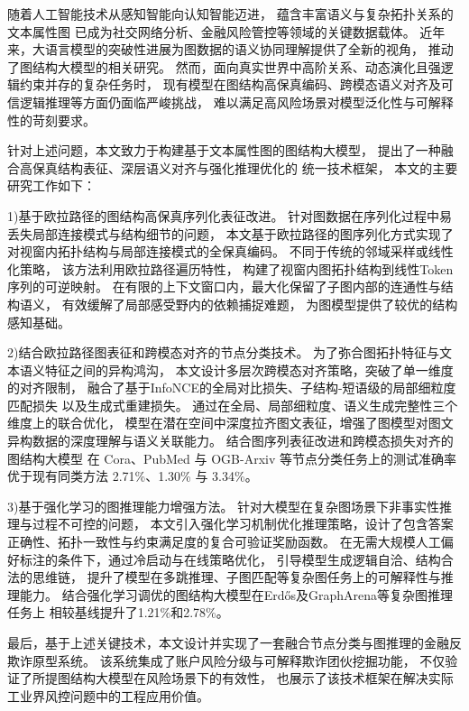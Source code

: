 \begin{cabstract}
    随着人工智能技术从感知智能向认知智能迈进，
    蕴含丰富语义与复杂拓扑关系的文本属性图
    已成为社交网络分析、金融风险管控等领域的关键数据载体。
    近年来，大语言模型的突破性进展为图数据的语义协同理解提供了全新的视角，
    推动了图结构大模型的相关研究。
    然而，面向真实世界中高阶关系、动态演化且强逻辑约束并存的复杂任务时，
    现有模型在图结构高保真编码、跨模态语义对齐及可信逻辑推理等方面仍面临严峻挑战，
    难以满足高风险场景对模型泛化性与可解释性的苛刻要求。
    
    针对上述问题，本文致力于构建基于文本属性图的图结构大模型，
    提出了一种融合高保真结构表征、深层语义对齐与强化推理优化的
    统一技术框架，
    本文的主要研究工作如下：

    1)基于欧拉路径的图结构高保真序列化表征改进。
    针对图数据在序列化过程中易丢失局部连接模式与结构细节的问题，
    本文基于欧拉路径的图序列化方式实现了
    对视窗内拓扑结构与局部连接模式的全保真编码。
    不同于传统的邻域采样或线性化策略，
    该方法利用欧拉路径遍历特性，
    构建了视窗内图拓扑结构到线性Token序列的可逆映射。
    在有限的上下文窗口内，最大化保留了子图内部的连通性与结构语义，
    有效缓解了局部感受野内的依赖捕捉难题，
    为图模型提供了较优的结构感知基础。

    
    2)结合欧拉路径图表征和跨模态对齐的节点分类技术。
    为了弥合图拓扑特征与文本语义特征之间的异构鸿沟，
    本文设计多层次跨模态对齐策略，突破了单一维度的对齐限制，
    融合了基于InfoNCE的全局对比损失、子结构-短语级的局部细粒度匹配损失
    以及生成式重建损失。
    通过在全局、局部细粒度、语义生成完整性三个维度上的联合优化，
    模型在潜在空间中深度拉齐图文表征，增强了图模型对图文异构数据的深度理解与语义关联能力。
    结合图序列表征改进和跨模态损失对齐的图结构大模型
    在 Cora、PubMed 与 OGB-Arxiv 等节点分类任务上的测试准确率优于现有同类方法 2.71\%、1.30\% 与 3.34\%。

    3)基于强化学习的图推理能力增强方法。
    针对大模型在复杂图场景下非事实性推理与过程不可控的问题，
    本文引入强化学习机制优化推理策略，设计了包含答案正确性、拓扑一致性与约束满足度的复合可验证奖励函数。
    在无需大规模人工偏好标注的条件下，通过冷启动与在线策略优化，
    引导模型生成逻辑自洽、结构合法的思维链，
    提升了模型在多跳推理、子图匹配等复杂图任务上的可解释性与推理能力。
    结合强化学习调优的图结构大模型在Erdős及GraphArena等复杂图推理任务上
    相较基线提升了1.21\%和2.78\%。

    最后，基于上述关键技术，本文设计并实现了一套融合节点分类与图推理的金融反欺诈原型系统。 
    该系统集成了账户风险分级与可解释欺诈团伙挖掘功能，
    不仅验证了所提图结构大模型在风险场景下的有效性，
    也展示了该技术框架在解决实际工业界风控问题中的工程应用价值。
    
\end{cabstract}
    
